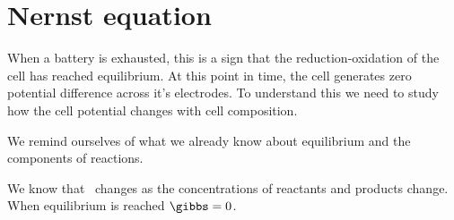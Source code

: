 \documentclass[../mit-general-chemistry.tex]{subfiles}
\begin{document}
\section{Nernst equation}


When a battery is exhausted, this is a sign that the
reduction-oxidation of the cell has reached equilibrium. At this point
in time, the cell generates zero potential difference across it's
electrodes. To understand this we need to study how the cell potential
changes with cell composition.


We remind ourselves of what we already know about equilibrium and the
components of reactions.

We know that \gibbs\ changes as the concentrations of reactants and
products change. When equilibrium is reached $\gibbs = 0$.
\end{document}
